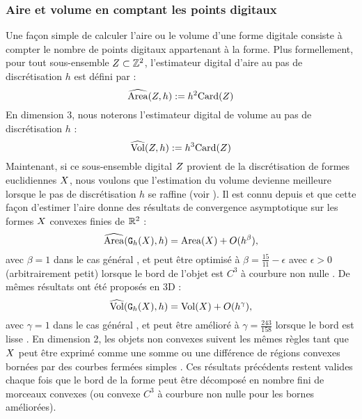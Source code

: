 \subsubsection{Aire et volume en comptant les points digitaux}
\label{sec:AreaByCounting}
%
Une façon simple de calculer l'aire ou le volume d'une forme digitale consiste à
compter le nombre de points digitaux appartenant à la forme. Plus formellement,
pour tout sous-ensemble $Z \subset \mathbb{Z}^2$, l'estimateur digital d'aire au pas
de discrétisation $h$ est défini par :
%
\begin{equation}
  \widehat{\mathrm{Area}}(Z, h) := h^2 \mathrm{Card}(Z)
\end{equation}
%
En dimension $3$, nous noterons l'estimateur digital de volume au pas de
discrétisation $h$ :
%
\begin{equation}
  \widehat{\mathrm{Vol}}(Z, h) := h^3 \mathrm{Card}(Z)
\end{equation}
%
Maintenant, si ce sous-ensemble digital $Z$ provient de la discrétisation de
formes euclidiennes $X$, nous voulons que l'estimation du volume devienne
meilleure lorsque le pas de discrétisation $h$ se raffine (voir
). Il est connu depuis
 et  que cette façon d'estimer l'aire donne
des résultats de convergence asymptotique sur les formes $X$ convexes
finies de $\mathbb{R}^2$ :
%
\begin{equation}
  \label{eq:AreaByCountingConv}
  \widehat{\mathrm{Area}}(\mathtt{G}_{h}(X),h) = \mathrm{Area}(X) + O(h^\beta),
\end{equation}
%
avec $\beta = 1$ dans le cas général \cite{Klette2000}, et peut être optimisé à
$\beta = \frac{15}{11} - \epsilon$ avec $\epsilon > 0$ (arbitrairement petit)
lorsque le bord de l'objet est $C^3$ à courbure non nulle \cite{Huxley1990}.
De mêmes résultats ont été proposés en 3D :
%
\begin{equation}
  \label{eq:VolumeByCountingConv}
  \widehat{\mathrm{Vol}}(\mathtt{G}_{h}(X),h) = \mathrm{Vol}(X) + O(h^\gamma),
\end{equation}
%
avec $\gamma = 1$ dans le cas général \cite{Kratzel1988}, et peut être amélioré à
$\gamma=\frac{243}{158}$ lorsque le bord est lisse \cite{Guo2010}.
%
En dimension 2, les objets non convexes suivent les mêmes règles tant que
$X$ peut être exprimé comme une somme ou une différence de régions convexes
bornées par des courbes fermées simples \cite{Huxley1996}. Ces résultats
précédents restent valides chaque fois que le bord de la forme peut être
décomposé en nombre fini de morceaux convexes (ou convexe $C^3$ à courbure non
nulle pour les bornes améliorées).
%
